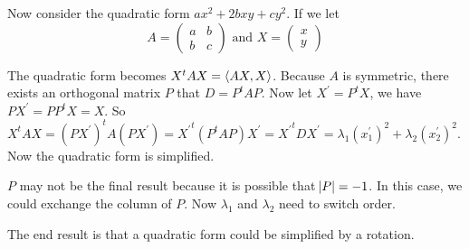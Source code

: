 \begin{example}
    Now consider the quadratic form $ax^2 + 2bxy + cy^2$. If we let 
\begin{equation}
    A = \begin{pmatrix}
        a & b \\
        b & c
    \end{pmatrix} \text{ and } X = \begin{pmatrix}
        x \\
        y
    \end{pmatrix}
\end{equation}

The quadratic form becomes $X^t A X = \left\langle \displaystyle AX, X \right\rangle$. Because $A$ is symmetric, there exists an orthogonal matrix $P$ that $D = P^t A P$. Now let $X^\prime = P^t X$, we have $PX^\prime = PP^tX = X$. So $X^t A X = (PX^\prime)^t A (PX^\prime) = {X^\prime}^t (P^t A P) X^\prime = {X^\prime}^t D X^\prime = \lambda_1 (x_1^\prime)^2 + \lambda_2 (x_2^\prime)^2$. Now the quadratic form is simplified.

$P$ may not be the final result because it is possible that $\abs{P} = -1$. In this case, we could exchange the column of $P$. Now $\lambda_1$ and $\lambda_2$ need to switch order.

The end result is that a quadratic form could be simplified by a rotation.
\end{example}
















































